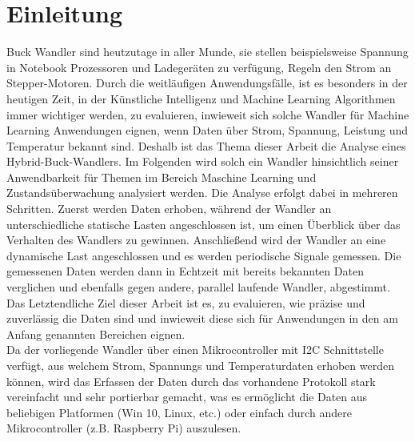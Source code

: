 \section{Einleitung}
\begin{flushleft}
Buck Wandler sind heutzutage in aller Munde, sie stellen beispielsweise Spannung in Notebook Prozessoren und Ladegeräten zu verfügung, Regeln den Strom an Stepper-Motoren. Durch die weitläufigen Anwendungsfälle, ist es besonders in der heutigen Zeit, in der Künstliche Intelligenz und Machine Learning Algorithmen immer wichtiger werden, zu evaluieren, inwieweit sich solche Wandler für Machine Learning Anwendungen eignen, wenn Daten über Strom, Spannung, Leistung und Temperatur bekannt sind. Deshalb ist das Thema dieser Arbeit die Analyse eines Hybrid-Buck-Wandlers. Im Folgenden wird solch ein Wandler hinsichtlich seiner Anwendbarkeit für Themen im Bereich Maschine Learning und Zustandsüberwachung analysiert werden. Die Analyse erfolgt dabei in mehreren Schritten. Zuerst werden Daten erhoben, während der Wandler an unterschiedliche statische Lasten angeschlossen ist, um einen Überblick über das Verhalten des Wandlers zu gewinnen. Anschließend wird der Wandler an eine dynamische Last angeschlossen und es werden periodische Signale gemessen. Die gemessenen Daten werden dann in Echtzeit mit bereits bekannten Daten verglichen und ebenfalls gegen andere, parallel laufende Wandler, abgestimmt. Das Letztendliche Ziel dieser Arbeit ist es, zu evaluieren, wie präzise und zuverlässig die Daten sind und inwieweit diese sich für Anwendungen in den am Anfang genannten Bereichen eignen.\\

Da der vorliegende Wandler über einen Mikrocontroller mit I2C Schnittstelle verfügt, aus welchem Strom, Spannungs und Temperaturdaten erhoben werden können, wird das Erfassen der Daten durch das vorhandene Protokoll stark vereinfacht und sehr portierbar gemacht, was es ermöglicht die Daten aus beliebigen Platformen (Win 10, Linux, etc.) oder einfach durch andere Mikrocontroller (z.B. Raspberry Pi) auszulesen.  



\end{flushleft}